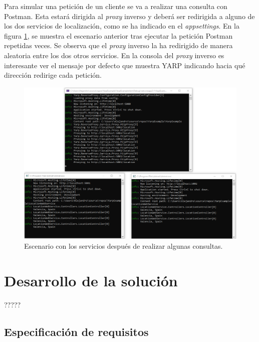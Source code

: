 \documentclass[11pt,spanish,listoffigures]{tfgetsinf}
\begin{document}
Para simular una petición de un cliente se va a realizar una consulta con Postman. Esta estará dirigida al \emph{proxy} inverso y deberá ser redirigida a alguno de los dos servicios de localización, como se ha indicado en el \emph{appsettings}. En la figura \ref{ejemploYARP_servicios_funcionando}, se muestra el escenario anterior tras ejecutar la petición Postman repetidas veces. Se observa que el \emph{proxy} inverso la ha redirigido de manera aleatoria entre los dos otros servicios. En la consola del \emph{proxy} inverso es interesante ver el mensaje por defecto que muestra YARP indicando hacia qué dirección redirige cada petición.

\begin{figure}[ht]
\centering
\includegraphics[width=1\textwidth]{imagenes/ejemploYARP/servicios_funcionando}
\caption{Escenario con los servicios después de realizar algunas consultas.}
	\label{ejemploYARP_servicios_funcionando}
\end{figure}


\chapter{Desarrollo de la solución}

?????


\section{Especificación de requisitos}
\end{document}

